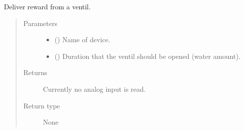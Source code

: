\documentclass[letterpaper,10pt,english]{sphinxmanual}
\begin{document}

\begin{fulllineitems}
\label{\detokenize{NoSeMazeController/HelperFunctions:HelperFunctions.Reward.deliver_reward_static}}
\pysigstartsignatures
{}
\pysigstopsignatures
\sphinxAtStartPar
Deliver reward from a ventil.
\begin{quote}\begin{description}
\item[{Parameters}] \leavevmode\begin{itemize}
\item {} 
\sphinxAtStartPar
{} () \textendash{} Name of device.

\item {} 
\sphinxAtStartPar
{} () \textendash{} Duration that the ventil should be opened (water amount).

\end{itemize}

\item[{Returns}] \leavevmode
\sphinxAtStartPar
{} \textendash{} Currently no analog input is read.

\item[{Return type}] \leavevmode
\sphinxAtStartPar
None

\end{description}\end{quote}

\end{fulllineitems}

\end{document}

